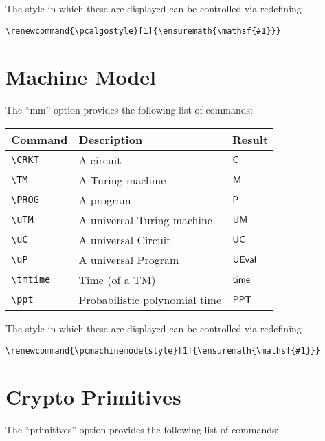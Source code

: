 \documentclass[a4paper]{report}
\begin{document}
The style in which these are displayed can be controlled via redefining
\begin{lstlisting}
\renewcommand{\pcalgostyle}[1]{\ensuremath{\mathsf{#1}}}
\end{lstlisting}


\section{Machine Model}
The \enquote{mm} option provides the following list of commands:

\begin{center}
\begin{tabular}{l l l}
\textbf{Command} & \textbf{Description} & \textbf{Result} \\\hline
\lstinline$\CRKT$ & A circuit & $\CRKT$  \\
\lstinline$\TM$ & A Turing machine & $\TM$  \\
\lstinline$\PROG$ & A program & $\PROG$  \\
\lstinline$\uTM$ & A universal Turing machine & $\uTM$  \\
\lstinline$\uC$ & A universal Circuit & $\uC$  \\
\lstinline$\uP$ & A universal Program & $\uP$  \\
\lstinline$\tmtime$ & Time (of a TM) & $\tmtime$  \\
\lstinline$\ppt$ & Probabilistic polynomial time & $\ppt$
\end{tabular}
\end{center}

The style in which these are displayed can be controlled via redefining
\begin{lstlisting}
\renewcommand{\pcmachinemodelstyle}[1]{\ensuremath{\mathsf{#1}}}
\end{lstlisting}

\section{Crypto Primitives}
The \enquote{primitives} option provides the following list of commands:
\end{document}
